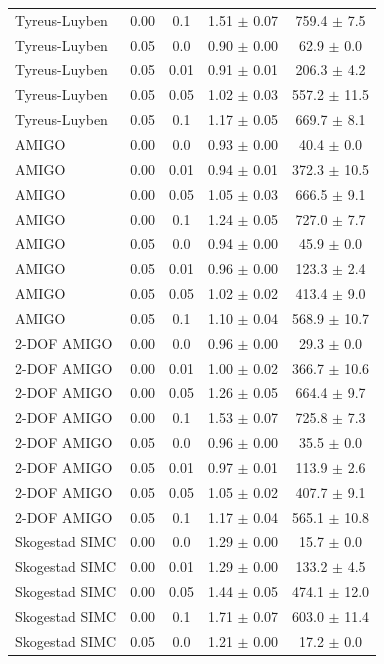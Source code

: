 \begin{table}[t]
{\begin{tabular}{lcccc}
Tyreus-Luyben & 0.00 & 0.1 & 1.51 $\pm$ 0.07 & 759.4 $\pm$ 7.5 \\
Tyreus-Luyben & 0.05 & 0.0 & 0.90 $\pm$ 0.00 & 62.9 $\pm$ 0.0 \\
Tyreus-Luyben & 0.05 & 0.01 & 0.91 $\pm$ 0.01 & 206.3 $\pm$ 4.2 \\
Tyreus-Luyben & 0.05 & 0.05 & 1.02 $\pm$ 0.03 & 557.2 $\pm$ 11.5 \\
Tyreus-Luyben & 0.05 & 0.1 & 1.17 $\pm$ 0.05 & 669.7 $\pm$ 8.1 \\
AMIGO & 0.00 & 0.0 & 0.93 $\pm$ 0.00 & 40.4 $\pm$ 0.0 \\
AMIGO & 0.00 & 0.01 & 0.94 $\pm$ 0.01 & 372.3 $\pm$ 10.5 \\
AMIGO & 0.00 & 0.05 & 1.05 $\pm$ 0.03 & 666.5 $\pm$ 9.1 \\
AMIGO & 0.00 & 0.1 & 1.24 $\pm$ 0.05 & 727.0 $\pm$ 7.7 \\
AMIGO & 0.05 & 0.0 & 0.94 $\pm$ 0.00 & 45.9 $\pm$ 0.0 \\
AMIGO & 0.05 & 0.01 & 0.96 $\pm$ 0.00 & 123.3 $\pm$ 2.4 \\
AMIGO & 0.05 & 0.05 & 1.02 $\pm$ 0.02 & 413.4 $\pm$ 9.0 \\
AMIGO & 0.05 & 0.1 & 1.10 $\pm$ 0.04 & 568.9 $\pm$ 10.7 \\
2-DOF AMIGO & 0.00 & 0.0 & 0.96 $\pm$ 0.00 & 29.3 $\pm$ 0.0 \\
2-DOF AMIGO & 0.00 & 0.01 & 1.00 $\pm$ 0.02 & 366.7 $\pm$ 10.6 \\
2-DOF AMIGO & 0.00 & 0.05 & 1.26 $\pm$ 0.05 & 664.4 $\pm$ 9.7 \\
2-DOF AMIGO & 0.00 & 0.1 & 1.53 $\pm$ 0.07 & 725.8 $\pm$ 7.3 \\
2-DOF AMIGO & 0.05 & 0.0 & 0.96 $\pm$ 0.00 & 35.5 $\pm$ 0.0 \\
2-DOF AMIGO & 0.05 & 0.01 & 0.97 $\pm$ 0.01 & 113.9 $\pm$ 2.6 \\
2-DOF AMIGO & 0.05 & 0.05 & 1.05 $\pm$ 0.02 & 407.7 $\pm$ 9.1 \\
2-DOF AMIGO & 0.05 & 0.1 & 1.17 $\pm$ 0.04 & 565.1 $\pm$ 10.8 \\
Skogestad SIMC & 0.00 & 0.0 & 1.29 $\pm$ 0.00 & 15.7 $\pm$ 0.0 \\
Skogestad SIMC & 0.00 & 0.01 & 1.29 $\pm$ 0.00 & 133.2 $\pm$ 4.5 \\
Skogestad SIMC & 0.00 & 0.05 & 1.44 $\pm$ 0.05 & 474.1 $\pm$ 12.0 \\
Skogestad SIMC & 0.00 & 0.1 & 1.71 $\pm$ 0.07 & 603.0 $\pm$ 11.4 \\
Skogestad SIMC & 0.05 & 0.0 & 1.21 $\pm$ 0.00 & 17.2 $\pm$ 0.0 \\

\end{tabular}}
\end{table}
